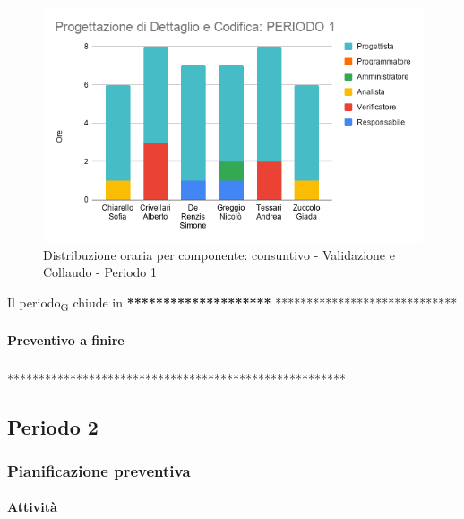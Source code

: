 \begin{figure}[H]
	\centering
	\includegraphics[scale=0.6]{res/images/charts/consuntivo/prog_dett_1.png}
	\caption{Distribuzione oraria per componente: consuntivo - Validazione e Collaudo - Periodo 1}
\end{figure}


Il periodo\textsubscript{G} chiude in \textbf{********************} *****************************


\paragraph{Preventivo a finire}
\subparagraph*{}

\pafTable{
	
}

******************************************************





\pagebreak
\subsection{Periodo 2}

\subsubsection{Pianificazione preventiva}

\paragraph{Attività}
\subparagraph*{}

\planningTable{
	
}


